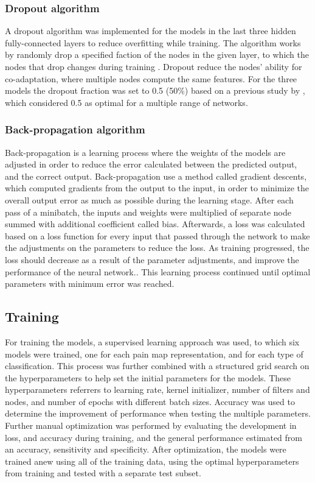 \subsubsection*{\textbf{Dropout algorithm}}
A dropout algorithm was implemented for the models in the last three hidden fully-connected layers to reduce overfitting while training. The algorithm works by randomly drop a specified faction of the nodes in the given layer, to which the nodes that drop changes during training \citep{Srivastava2014}.  Dropout reduce the nodes’ ability for co-adaptation, where multiple nodes compute the same features. For the three models the dropout fraction was set to 0.5 (50\%) based on a previous study by \citeauthor{Srivastava2014} \citep{Srivastava2014}, which considered 0.5 as optimal for a multiple range of networks.   

\subsubsection*{\textbf{Back-propagation algorithm}}
Back-propagation is a learning process where the weights of the models are adjusted in order to reduce the error calculated between the predicted output, and the correct output.\citep{Duda2000} Back-propagation use a method called gradient descents, which computed gradients from the output to the input, in order to minimize the overall output error as much as possible during the learning stage. 
After each pass of a minibatch, the inputs and weights were multiplied of separate node summed with additional coefficient called bias.\citep{LeCun1998, Hameed2016}
Afterwards, a loss was calculated based on a loss function for every input that passed through the network to make the adjustments on the parameters to reduce the loss. As training progressed, the loss should decrease as a result of the parameter adjustments, and improve the performance of the neural network.\citep{Goodfellow2016, LeCun2015, Duda2000}. This learning process continued until optimal parameters with minimum error was reached.\citep{Hameed2016}

\subsection*{\textbf{Training}}
For training the models, a supervised learning approach was used, to which six models were trained, one for each pain map representation, and for each type of classification. 
This process was further combined with a structured grid search on the hyperparameters to help set the initial parameters for the models. These hyperparameters referrers to learning rate, kernel initializer, number of filters and nodes, and number of epochs with different batch sizes. Accuracy was used to determine the improvement of performance when testing the multiple parameters.
Further manual optimization was performed by evaluating the development in loss, and accuracy during training, and the general performance estimated from an accuracy, sensitivity and specificity. After optimization, the models were trained anew using all of the training data, using the optimal hyperparameters from training and tested with a separate test subset.
 


